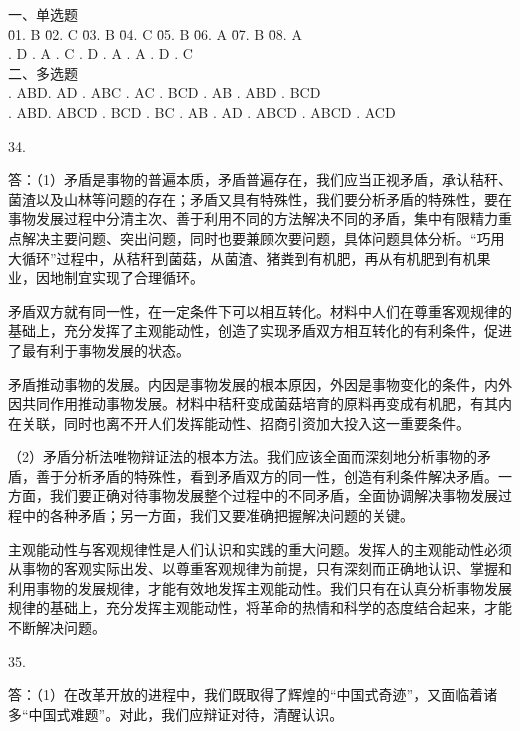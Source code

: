 \documentclass[a4paper]{article}
\begin{document}
\begin{tabbing}
一、单选题\\
\= 01. B \qquad \= 02. C \qquad \= 03. B \qquad \= 04. C \qquad \= 05. B \qquad \= 06. A \qquad \= 07. B \qquad \= 08. A \qquad \= \\
. D . A . C . D . A . A . D . C \\
二、多选题\\
. ABD. AD . ABC . AC . BCD . AB . ABD . BCD \\
. ABD. ABCD . BCD . BC . AB . AD . ABCD . ABCD . ACD \\
\end{tabbing}

34.

答：（1）矛盾是事物的普遍本质，矛盾普遍存在，我们应当正视矛盾，承认秸秆、菌渣以及山林等问题的存在；矛盾又具有特殊性，我们要分析矛盾的特殊性，要在事物发展过程中分清主次、善于利用不同的方法解决不同的矛盾，集中有限精力重点解决主要问题、突出问题，同时也要兼顾次要问题，具体问题具体分析。“巧用大循环”过程中，从秸秆到菌菇，从菌渣、猪粪到有机肥，再从有机肥到有机果业，因地制宜实现了合理循环。

矛盾双方就有同一性，在一定条件下可以相互转化。材料中人们在尊重客观规律的基础上，充分发挥了主观能动性，创造了实现矛盾双方相互转化的有利条件，促进了最有利于事物发展的状态。

矛盾推动事物的发展。内因是事物发展的根本原因，外因是事物变化的条件，内外因共同作用推动事物发展。材料中秸秆变成菌菇培育的原料再变成有机肥，有其内在关联，同时也离不开人们发挥能动性、招商引资加大投入这一重要条件。

（2）矛盾分析法唯物辩证法的根本方法。我们应该全面而深刻地分析事物的矛盾，善于分析矛盾的特殊性，看到矛盾双方的同一性，创造有利条件解决矛盾。一方面，我们要正确对待事物发展整个过程中的不同矛盾，全面协调解决事物发展过程中的各种矛盾；另一方面，我们又要准确把握解决问题的关键。

主观能动性与客观规律性是人们认识和实践的重大问题。发挥人的主观能动性必须从事物的客观实际出发、以尊重客观规律为前提，只有深刻而正确地认识、掌握和利用事物的发展规律，才能有效地发挥主观能动性。我们只有在认真分析事物发展规律的基础上，充分发挥主观能动性，将革命的热情和科学的态度结合起来，才能不断解决问题。

35.

答：（1）在改革开放的进程中，我们既取得了辉煌的“中国式奇迹”，又面临着诸多“中国式难题”。对此，我们应辩证对待，清醒认识。
\end{document}
